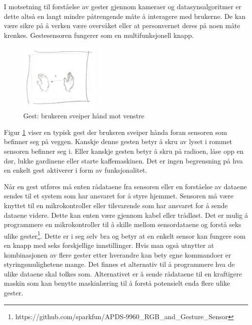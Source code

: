 I motsetning til forståelse av gester gjennom kameraer og datasynsalgoritmer er dette altså en langt mindre påtrengende måte å interagere med brukerne. De kan være sikre på å verken være overvåket eller at personvernet deres på noen måte krenkes. Gestesensoren fungerer som en multifunksjonell knapp.\\
\begin{figure}
    \vspace{-20pt}
  \begin{center}
    \includegraphics[width=0.35\textwidth]{fig/swipe-l-r}
  \end{center}
  \vspace{-20pt}
  \caption{Gest: brukeren sveiper hånd mot venstre}
  \label{fig:gest}
  \vspace{-7pt}
\end{figure}
Figur \ref{fig:gest} viser en typisk gest der brukeren sveiper hånda foran sensoren som befinner seg på veggen. Kanskje denne gesten betyr å skru av lyset i rommet sensoren befinner seg i. Eller kanskje gesten betyr å skru på radioen, låse opp en dør, lukke gardinene eller starte kaffemaskinen. Det er ingen begrensning på hva en enkelt gest aktiverer i form av funksjonalitet.

Når en gest utføres må enten rådataene fra sensoren eller en forståelse av dataene sendes til et system som har ansvaret for å styre hjemmet. Sensoren må være knyttet til en mikrokontroller eller tilsvarende som har ansvaret for å sende dataene videre. Dette kan enten være gjennom kabel eller trådløst. Det er mulig å programmere en mikrokontroller til å skille mellom sensordataene og forstå seks ulike gester\footnote{https://github.com/sparkfun/APDS-9960\_RGB\_and\_Gesture\_Sensor}. Dette er i seg selv bra og betyr at en enkelt sensor kan fungere som en knapp med seks forskjellige innstillinger. Hvis man også utnytter at kombinasjonen av flere gester etter hverandre kan bety egne kommandoer er styringsmulighetene mange. Det finnes et alternativ til å programmere hva de ulike dataene skal tolkes som. Alternativet er å sende rådataene til en kraftigere maskin som kan benytte maskinlæring til å forstå potensielt enda flere ulike gester.

